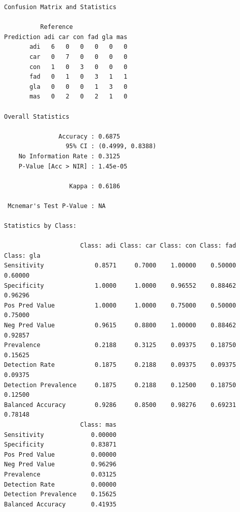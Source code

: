 \documentclass[
  letterpaper,
  DIV=11,
  numbers=noendperiod]{scrartcl}
\begin{document}
\begin{verbatim}
Confusion Matrix and Statistics

          Reference
Prediction adi car con fad gla mas
       adi   6   0   0   0   0   0
       car   0   7   0   0   0   0
       con   1   0   3   0   0   0
       fad   0   1   0   3   1   1
       gla   0   0   0   1   3   0
       mas   0   2   0   2   1   0

Overall Statistics
                                          
               Accuracy : 0.6875          
                 95% CI : (0.4999, 0.8388)
    No Information Rate : 0.3125          
    P-Value [Acc > NIR] : 1.45e-05        
                                          
                  Kappa : 0.6186          
                                          
 Mcnemar's Test P-Value : NA              

Statistics by Class:

                     Class: adi Class: car Class: con Class: fad Class: gla
Sensitivity              0.8571     0.7000    1.00000    0.50000    0.60000
Specificity              1.0000     1.0000    0.96552    0.88462    0.96296
Pos Pred Value           1.0000     1.0000    0.75000    0.50000    0.75000
Neg Pred Value           0.9615     0.8800    1.00000    0.88462    0.92857
Prevalence               0.2188     0.3125    0.09375    0.18750    0.15625
Detection Rate           0.1875     0.2188    0.09375    0.09375    0.09375
Detection Prevalence     0.1875     0.2188    0.12500    0.18750    0.12500
Balanced Accuracy        0.9286     0.8500    0.98276    0.69231    0.78148
                     Class: mas
Sensitivity             0.00000
Specificity             0.83871
Pos Pred Value          0.00000
Neg Pred Value          0.96296
Prevalence              0.03125
Detection Rate          0.00000
Detection Prevalence    0.15625
Balanced Accuracy       0.41935
\end{verbatim}
\end{document}
